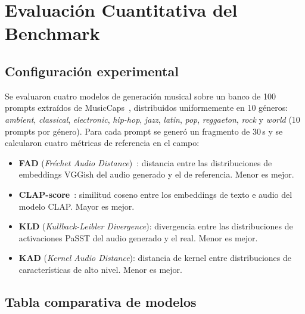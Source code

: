 
\section{Evaluación Cuantitativa del Benchmark}
\label{sec:benchmark}

\subsection{Configuración experimental}
\label{sec:benchmark:setup}

Se evaluaron cuatro modelos de generación musical sobre un banco de 100
prompts extraídos de MusicCaps~\cite{agostinelli2023musiclm}, distribuidos
uniformemente en 10 géneros: \textit{ambient}, \textit{classical},
\textit{electronic}, \textit{hip-hop}, \textit{jazz}, \textit{latin},
\textit{pop}, \textit{reggaeton}, \textit{rock} y \textit{world}
(10 prompts por género).
Para cada prompt se generó un fragmento de 30\,s y se calcularon cuatro
métricas de referencia en el campo:

\begin{itemize}
  \item \textbf{FAD} (\textit{Fréchet Audio Distance})~\cite{kilgour2019fad}:
        distancia entre las distribuciones de embeddings VGGish del audio
        generado y el de referencia. Menor es mejor.
  \item \textbf{CLAP-score}~\cite{wu2023large}: similitud coseno entre
        los embeddings de texto e audio del modelo CLAP. Mayor es mejor.
  \item \textbf{KLD} (\textit{Kullback-Leibler Divergence}):
        divergencia entre las distribuciones de activaciones PaSST del
        audio generado y el real. Menor es mejor.
  \item \textbf{KAD} (\textit{Kernel Audio Distance}): distancia de kernel
        entre distribuciones de características de alto nivel. Menor es mejor.
\end{itemize}

\subsection{Tabla comparativa de modelos}
\label{sec:benchmark:tabla}

